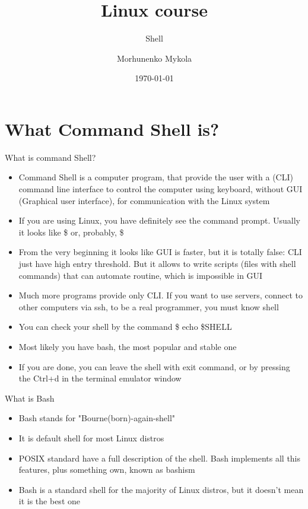 \documentclass[usenames,dvipsnames,10pt,aspectratio=169]{beamer}
\title{Linux course}
\subtitle{Shell}
\date[\today]{\small\today}
\author[Morhunenko Mykola]{Morhunenko Mykola}
\institute{APPS@UCU}
\begin{document}
\begin{frame}
\titlepage
\end{frame}

\begin{frame}{\contentsname}
\tableofcontents
\end{frame}

\section{What Command Shell is?}

\begin{frame}{What is command Shell?}
\begin{itemize}
    \item Command Shell is a computer program, that provide the user with a (CLI) command line interface to control the computer using keyboard, without GUI (Graphical user interface), for communication with the Linux system
    \item If you are using Linux, you have definitely see the command prompt. Usually it looks like {\color{ucugreen}\$} or, probably, {\color{ucugreen} \$}
    \item From the very beginning it looks like GUI is faster, but it is totally false: CLI just have high entry threshold. But it allows to write scripts (files with shell commands) that can automate routine, which is impossible in GUI
    \item Much more programs provide only CLI. If you want to use servers, connect to other computers via ssh, to be a real programmer, you must know shell
    \item You can check your shell by the command {\color{ucugreen} \$ echo \$SHELL}
    \item Most likely you have {\color{ucugreen} bash}, the most popular and stable one
    \item If you are done, you can leave the shell with {\color{ucugreen} exit} command, or by pressing the {\color{ucugreen}Ctrl+d} in the terminal emulator window
\end{itemize}
\end{frame}

\begin{frame}{What is Bash}
\begin{itemize}
    \item Bash stands for "Bourne(born)-again-shell"
    \item It is default shell for most Linux distros
    \item POSIX standard have a full description of the shell. Bash implements all this features, plus something own, known as {\color{ucugreen} bashism}
    \item Bash is a standard shell for the majority of  Linux distros, but it doesn't mean it is the best one
\end{itemize}
\end{frame}
\end{document}
